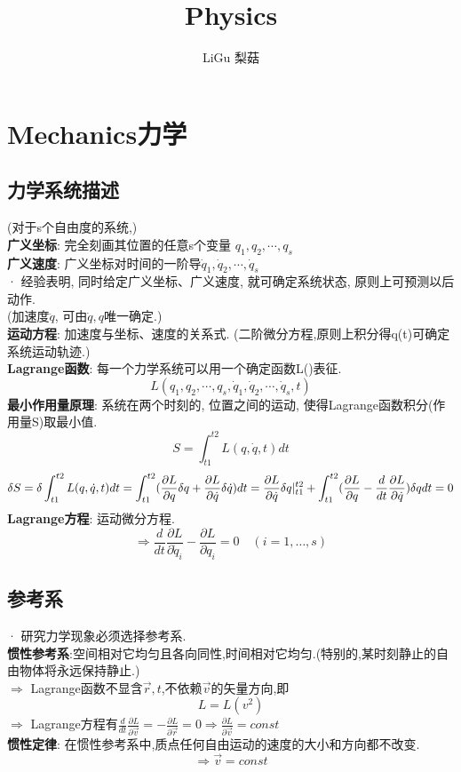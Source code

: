 \documentclass{article}
\title{Physics}\author{LiGu 梨菇}\date{}
\begin{document}
\maketitle

\section{Mechanics力学}
\subsection{力学系统描述}
(对于s个自由度的系统,)\\
\textbf{广义坐标}: 完全刻画其位置的任意s个变量 $q_{1},q_{2},\cdots,q_{s}$\\
\textbf{广义速度}: 广义坐标对时间的一阶导$\dot q_{1},\dot q_{2},\cdots,\dot q_{s}$\\
· 经验表明, 同时给定广义坐标、广义速度, 就可确定系统状态, 原则上可预测以后动作.\\
(加速度$\ddot q$, 可由$\dot q,q$唯一确定.)\\
\textbf{运动方程}: 加速度与坐标、速度的关系式. (二阶微分方程,原则上积分得q(t)可确定系统运动轨迹.)\\
\textbf{Lagrange函数}: 每一个力学系统可以用一个确定函数L()表征.
\[L(q_{1},q_{2},\cdots,q_{s},\dot q_{1},\dot q_{2},\cdots,\dot q_{s},t)\]
\textbf{最小作用量原理}: 系统在两个时刻的, 位置之间的运动, 使得Lagrange函数积分(作用量S)取最小值.
\[S = \int_{t1}^{t2} L(q,\dot q,t)dt\]
\[\delta S = \delta \int_{t1}^{t2} L(q,\dot q,t)dt
 = \int_{t1}^{t2} (\frac{\partial L}{\partial q}\delta q + \frac{\partial L}{\partial \dot q}\delta \dot q) dt
 = \frac{\partial L}{\partial \dot q} \delta q \arrowvert_{t1}^{t2}
 + \int_{t1}^{t2} (\frac{\partial L}{\partial q} - \frac{d}{dt} \frac{\partial L}{\partial \dot q}) \delta q dt
 = 0\]
\textbf{Lagrange方程}: 运动微分方程. 
\[\Rightarrow \frac{d}{dt}\frac{\partial L}{\partial \dot q_i} - \frac{\partial L}{\partial q_i} = 0\quad(i=1,\dots,s)\]


\subsection{参考系}
· 研究力学现象必须选择参考系.\\
\textbf{惯性参考系}:空间相对它均匀且各向同性,时间相对它均匀.(特别的,某时刻静止的自由物体将永远保持静止.)\\
$\Rightarrow$ Lagrange函数不显含$\vec r,t$,不依赖$\vec v$的矢量方向,即
\[L = L(v^2)\]
$\Rightarrow$ Lagrange方程有$\frac{d}{dt}\frac{\partial L}{\partial \vec v} = -\frac{\partial L}{\partial \vec r} = 0 \Rightarrow \frac{\partial L}{\partial \vec v}=const$\\
\textbf{惯性定律}: 在惯性参考系中,质点任何自由运动的速度的大小和方向都不改变.
\[\Rightarrow \vec v = const\]
\end{document}
